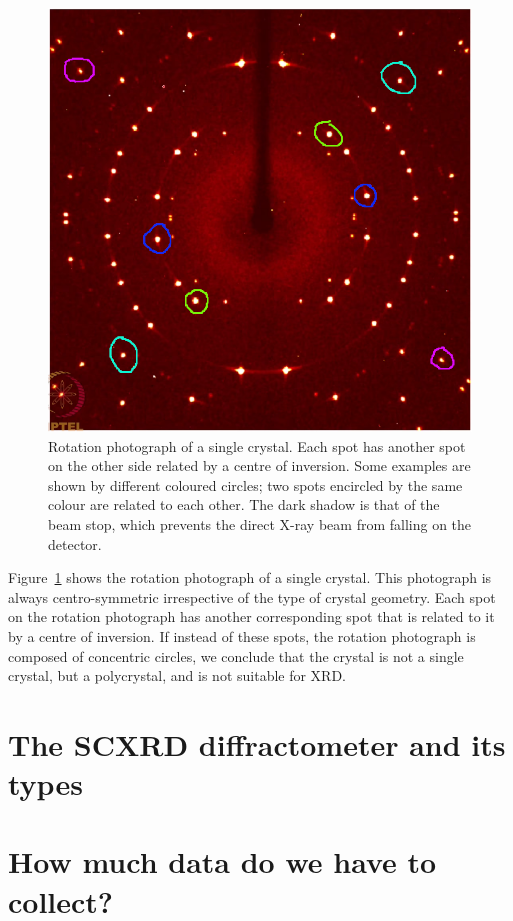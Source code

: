 \documentclass[11pt,a4paper]{article}
\begin{document}
		\begin{figure}[h]
			\centering
			\includegraphics[scale=0.3]{rotation_photograph_mod.png}
			\caption{\label{fig:rotation_photo}Rotation photograph of a single crystal. Each spot has another spot on the other side related by a centre of inversion. Some examples are shown by different coloured circles; two spots encircled by the same colour are related to each other. The dark shadow is that of the beam stop, which prevents the direct X-ray beam from falling on the detector.}
		\end{figure}
		
		Figure~\ref{fig:rotation_photo} shows the rotation photograph of a single crystal. This photograph is always centro-symmetric irrespective of the type of crystal geometry. Each spot on the rotation photograph has another corresponding spot that is related to it by a centre of inversion. If instead of these spots, the rotation photograph is composed of concentric circles, we conclude that the crystal is not a single crystal, but a polycrystal, and is not suitable for XRD.

	
	\section{The SCXRD diffractometer and its types}
	
	\section{How much data do we have to collect?}
	
	
		
\end{document}
